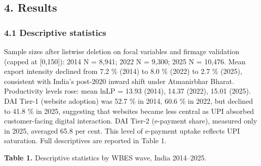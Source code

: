 \documentclass[
  12pt,a4paper]{article}
\begin{document}
\hypertarget{results}{%
\subsection{4. Results}\label{results}}

\hypertarget{descriptive-statistics}{%
\subsubsection{4.1 Descriptive
statistics}\label{descriptive-statistics}}

Sample sizes after listwise deletion on focal variables and firmage
validation (capped at {[}0,150{]}): 2014 N = 8,941; 2022 N = 9,300; 2025
N = 10,476. Mean export intensity declined from 7.2 \% (2014) to 8.0 \%
(2022) to 2.7 \% (2025), consistent with India's post-2020 inward shift
under Atmanirbhar Bharat. Productivity levels rose: mean lnLP = 13.93
(2014), 14.37 (2022), 15.01 (2025). DAI Tier-1 (website adoption) was
52.7 \% in 2014, 60.6 \% in 2022, but declined to 41.8 \% in 2025,
suggesting that websites became less central as UPI absorbed
customer-facing digital interaction. DAI Tier-2 (e-payment share),
measured only in 2025, averaged 65.8 per cent. This level of e-payment
uptake reflects UPI saturation. Full descriptives are reported in Table
1.

\textbf{Table 1.} Descriptive statistics by WBES wave, India 2014--2025.
\end{document}
